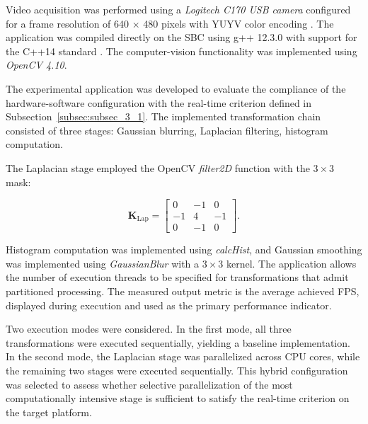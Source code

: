 \documentclass[
]{ceurart}
\begin{document}
Video acquisition was performed using a \textit{Logitech C170 USB camera} configured for a frame resolution of 640 × 480 pixels with YUYV color encoding \cite{logitech_c170_guide}. The application was compiled directly on the SBC using g++ 12.3.0 with support for the C++14 standard \cite{isoiec14882_2014}. The computer-vision functionality was implemented using \textit{OpenCV 4.10}.

The experimental application was developed to evaluate the compliance of the hardware-software configuration with the real-time criterion defined in Subsection~\ref{subsec:subsec_3_1}. The implemented transformation chain consisted of three stages: Gaussian blurring, Laplacian filtering, histogram computation.


The Laplacian stage employed the OpenCV \textit{filter2D} function with the $3 \times 3$ mask:

\begin{equation}
	\mathbf{K}_{\mathrm{Lap}}=
	\begin{bmatrix}
		0 & -1 & 0 \\
		-1 & 4 & -1 \\
		0 & -1 & 0
	\end{bmatrix}.
\end{equation}

Histogram computation was implemented using \textit{calcHist}, and Gaussian smoothing was implemented using \textit{GaussianBlur} with a $3 \times 3$ kernel. The application allows the number of execution threads to be specified for transformations that admit partitioned processing. The measured output metric is the average achieved FPS, displayed during execution and used as the primary performance indicator.

Two execution modes were considered. In the first mode, all three transformations were executed sequentially, yielding a baseline implementation. In the second mode, the Laplacian stage was parallelized across CPU cores, while the remaining two stages were executed sequentially. This hybrid configuration was selected to assess whether selective parallelization of the most computationally intensive stage is sufficient to satisfy the real-time criterion on the target platform.
\end{document}

